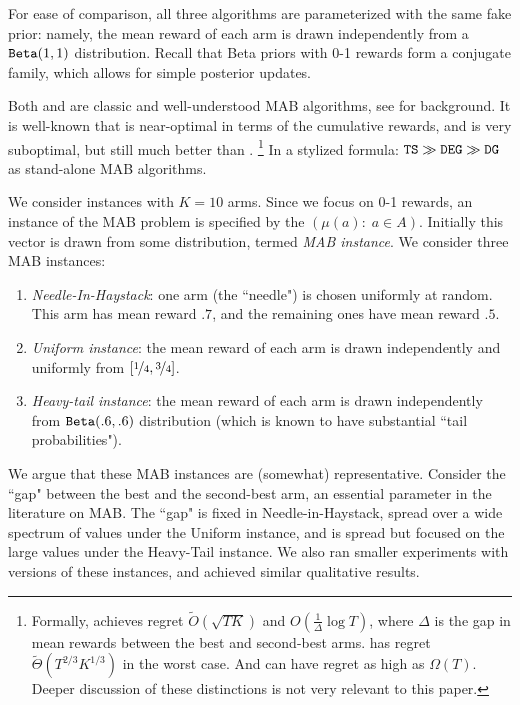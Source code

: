 \documentclass[../competing_bandits.tex]{subfiles}
\begin{document}
For ease of comparison, all three algorithms are parameterized with the same fake prior: namely, the mean reward of each arm is drawn independently from a $\mathtt{Beta}(1,1)$ distribution. Recall that Beta priors with 0-1 rewards form a conjugate family, which allows for simple posterior updates.

Both \DEG and \TS are classic and well-understood MAB algorithms, see \cite{Bubeck-survey12,TS-survey-FTML18} for background. It is well-known that \TS is near-optimal in terms of the cumulative rewards, and \DEG is very suboptimal, but still much better than \DG.%
\footnote{Formally, \TS achieves regret
    $\tilde{O}(\sqrt{TK})$ and
    $O(\tfrac{1}{\Delta} \log T)$,
where $\Delta$ is the gap in mean rewards between the best and second-best arms. \DEG has regret $\tilde{\Theta}(T^{2/3} K^{1/3})$ in the worst case. And \DG can have regret as high as $\Omega(T)$. Deeper discussion of these distinctions is not very relevant to this paper.}
In a stylized formula:
    $ \mathtt{TS} \gg \mathtt{DEG} \gg \mathtt{DG} $
as stand-alone MAB algorithms.

We consider instances with $K=10$ arms. Since we focus on 0-1 rewards, an instance of the MAB problem is specified by the \emph{\MRV} $(\mu(a):\; a\in A)$. Initially this vector is drawn from some distribution, termed \emph{MAB instance}. We consider three MAB instances:
\begin{enumerate}
\item \emph{Needle-In-Haystack}: one arm (the ``needle") is chosen uniformly at random. This arm has mean reward $.7$, and the remaining ones have mean reward $.5$.

\item \emph{Uniform instance}: the mean reward of each arm is drawn independently and uniformly from $[\nicefrac{1}{4}, \nicefrac{3}{4}]$.
\item \emph{Heavy-tail instance}: the mean reward of each arm is drawn independently from $\mathtt{Beta}(.6,.6)$ distribution (which is known to have substantial ``tail probabilities").
\end{enumerate}
We argue that these MAB instances are (somewhat) representative. Consider the ``gap" between the best and the second-best arm, an essential parameter in the literature on MAB. The ``gap" is fixed in Needle-in-Haystack, spread over a wide spectrum of values under the Uniform instance, and is spread but  focused on the large values under the Heavy-Tail instance. We also ran smaller experiments with versions of these instances, and achieved similar qualitative results.
\end{document}
